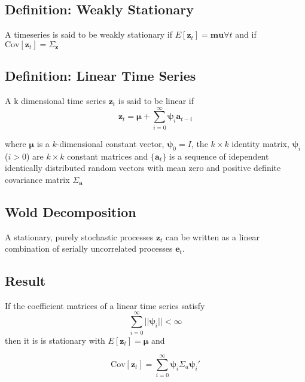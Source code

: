 \documentclass{article}
\begin{document}
        \subsection{Definition: Weakly Stationary}
            A timeseries is said to be weakly stationary if $E[\mathbf{z}_t]
            = \mathbf{mu} \forall t$ and if $\text{Cov}[\mathbf{z}_t] = \Sigma_\mathbf{z}$
        
        \subsection{Definition: Linear Time Series}
            A k dimensional time series $\mathbf{z}_t$ is said to be linear
            if
            \begin{equation}
                 \mathbf{z}_t = \mathbf{\mu} + \sum_{i=0}^\infty \mathbf{\psi}_i \mathbf{a}_{t-i}
            \end{equation}

            where $\mathbf{\mu}$ is a $k$-dimensional constant vector, 
            $\mathbf{\psi}_0 = I$, the $k \times k$
            identity matrix, $\mathbf{\psi}_i$ ($i > 0$) are $k \times k$
            constant matrices and $\{\mathbf{a}_t\}$ is a sequence of 
            idependent identically distributed random vectors with
            mean zero and positive definite covariance matrix $\Sigma_\mathbf{a}$


        \subsection{Wold Decomposition}
            A stationary, purely stochastic processes $\mathbf{z}_t$ can
            be written as a linear combination of serially uncorrelated
            processes $\mathbf{e}_t$.

        \subsection{Result}
            If the coefficient matrices of a linear time series
            satisfy
            \[\sum_{i=0}^\infty ||\mathbf{\psi}_i|| < \infty \]
            then it is is stationary  with $E[\mathbf{z}_t] = \mathbf{\mu}$ and

            \begin{equation}
                \text{Cov}[\mathbf{z}_t] = \sum_{i=0}^\infty 
                \mathbf{\psi}_i \Sigma_a \mathbf{\psi}_i'
            \end{equation}
\end{document}
